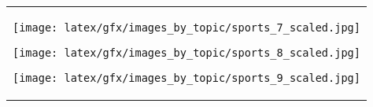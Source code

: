 \begin{table*}[ht]
\begin{tabular}{c}
\begin{minipage}{0.08\textwidth}
                        \centering
                        \texttt{[image: latex/gfx/images\_by\_topic/sports\_7\_scaled.jpg]}
                    \end{minipage}
                    \begin{minipage}{0.08\textwidth}
                        \centering
                        \texttt{[image: latex/gfx/images\_by\_topic/sports\_8\_scaled.jpg]}
                    \end{minipage}
                    \begin{minipage}{0.08\textwidth}
                        \centering
                        \texttt{[image: latex/gfx/images\_by\_topic/sports\_9\_scaled.jpg]}
                    \end{minipage}
                \\
    

\end{tabular}
\end{table*}

